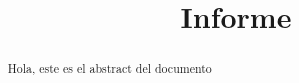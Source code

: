 \documentclass[12pt]{article}
\title{Informe}
\begin{document}
\begin{abstract}
    Hola, este es el abstract del documento
\end{abstract}
\end{document}
